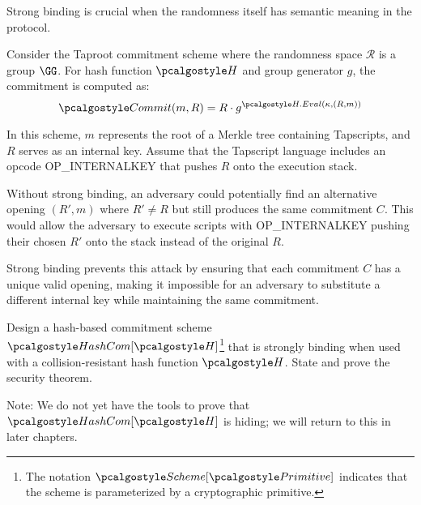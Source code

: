 \ifsolutions
\begin{mysolution}
  Strong binding is crucial when the randomness itself has semantic meaning in the protocol.

  Consider the Taproot commitment scheme where the randomness space $\mathcal{R}$ is a group $\GG$.
  For hash function $\algo{H}$ and group generator $g$, the commitment is computed as:
  \[
    \algo{Commit}(m, R) = R \cdot g^{\algo{H.Eval}(\kappa, (R, m))}
  \]

  In this scheme, $m$ represents the root of a Merkle tree containing Tapscripts, and $R$ serves as an internal key.
  Assume that the Tapscript language includes an opcode OP\_INTERNALKEY that pushes $R$ onto the execution stack.

  Without strong binding, an adversary could potentially find an alternative opening $(R', m)$ where $R' \neq R$ but still produces the same commitment $C$.
  This would allow the adversary to execute scripts with OP\_INTERNALKEY pushing their chosen $R'$ onto the stack instead of the original $R$.

  Strong binding prevents this attack by ensuring that each commitment $C$ has a unique valid opening, making it impossible for an adversary to substitute a different internal key while maintaining the same commitment.
\end{mysolution}
\fi

\begin{exercise}
  Design a hash-based commitment scheme $\algo{HashCom}[\algo{H}]$\footnote{The notation $\algo{Scheme}[\algo{Primitive}]$ indicates that the scheme is parameterized by a cryptographic primitive.} that is strongly binding when used with a collision-resistant hash function $\algo{H}$.
  State and prove the security theorem.
  
  Note: We do not yet have the tools to prove that $\algo{HashCom}[\algo{H}]$ is hiding; we will return to this in later chapters.
\end{exercise}

